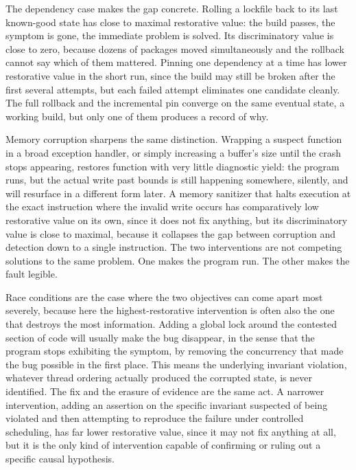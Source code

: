 \documentclass[11pt]{article}
\begin{document}
The dependency case makes the gap concrete. Rolling a lockfile back to its last known-good state has close to maximal restorative value: the build passes, the symptom is gone, the immediate problem is solved. Its discriminatory value is close to zero, because dozens of packages moved simultaneously and the rollback cannot say which of them mattered. Pinning one dependency at a time has lower restorative value in the short run, since the build may still be broken after the first several attempts, but each failed attempt eliminates one candidate cleanly. The full rollback and the incremental pin converge on the same eventual state, a working build, but only one of them produces a record of why.

Memory corruption sharpens the same distinction. Wrapping a suspect function in a broad exception handler, or simply increasing a buffer's size until the crash stops appearing, restores function with very little diagnostic yield: the program runs, but the actual write past bounds is still happening somewhere, silently, and will resurface in a different form later. A memory sanitizer that halts execution at the exact instruction where the invalid write occurs has comparatively low restorative value on its own, since it does not fix anything, but its discriminatory value is close to maximal, because it collapses the gap between corruption and detection down to a single instruction. The two interventions are not competing solutions to the same problem. One makes the program run. The other makes the fault legible.

Race conditions are the case where the two objectives can come apart most severely, because here the highest-restorative intervention is often also the one that destroys the most information. Adding a global lock around the contested section of code will usually make the bug disappear, in the sense that the program stops exhibiting the symptom, by removing the concurrency that made the bug possible in the first place. This means the underlying invariant violation, whatever thread ordering actually produced the corrupted state, is never identified. The fix and the erasure of evidence are the same act. A narrower intervention, adding an assertion on the specific invariant suspected of being violated and then attempting to reproduce the failure under controlled scheduling, has far lower restorative value, since it may not fix anything at all, but it is the only kind of intervention capable of confirming or ruling out a specific causal hypothesis.
\end{document}
